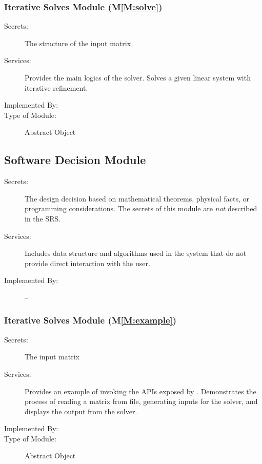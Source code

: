 \documentclass[12pt, titlepage]{article}
\newcommand{\mref}[1]{M\ref{#1}}
\begin{document}
\subsubsection{Iterative Solves Module (\mref{M:solve})}

\begin{description}
\item[Secrets:] The structure of the input matrix
\item[Services:] Provides the main logics of the solver. Solves a given linear
  system with iterative refinement.
\item[Implemented By:] \progname{}
\item[Type of Module:] Abstract Object
\end{description}

\subsection{Software Decision Module}

\begin{description}
\item[Secrets:] The design decision based on mathematical theorems, physical
  facts, or programming considerations. The secrets of this module are
  \emph{not} described in the SRS.
\item[Services:] Includes data structure and algorithms used in the system that
  do not provide direct interaction with the user.
\item[Implemented By:] --
\end{description}

\subsubsection{Iterative Solves Module (\mref{M:example})}

\begin{description}
\item[Secrets:] The input matrix
\item[Services:] Provides an example of invoking the APIs exposed by \progname{}.
  Demonstrates the process of reading a matrix from file, generating inputs for
  the solver, and displays the output from the solver.
\item[Implemented By:] \progname{}
\item[Type of Module:] Abstract Object
\end{description}
\end{document}

